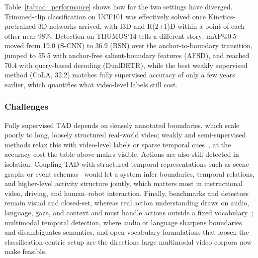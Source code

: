 Table~\ref{tab:ad_performance} shows how far the two settings have diverged. Trimmed-clip classification on UCF101 was effectively solved once Kinetics-pretrained 3D networks arrived, with I3D and R(2+1)D within a point of each other near 98\%. Detection on THUMOS'14 tells a different story: mAP@0.5 moved from 19.0 (S-CNN) to 36.9 (BSN) over the anchor-to-boundary transition, jumped to 55.5 with anchor-free salient-boundary features (AFSD), and reached 70.4 with query-based decoding (DualDETR), while the best weakly supervised method (CoLA, 32.2) matches fully supervised accuracy of only a few years earlier, which quantifies what video-level labels still cost.


\subsubsection{Challenges}
Fully supervised TAD depends on densely annotated boundaries, which scale poorly to long, loosely structured real-world video; weakly and semi-supervised methods relax this with video-level labels or sparse temporal cues~\cite{zhao2025pose,ghoddoosian2023weakly}, at the accuracy cost the table above makes visible.
Actions are also still detected in isolation. Coupling TAD with structured temporal representations such as scene graphs or event schemas~\cite{wu2025universal,lu2025benchmarking} would let a system infer boundaries, temporal relations, and higher-level activity structure jointly, which matters most in instructional video, driving, and human--robot interaction.
Finally, benchmarks and detectors remain visual and closed-set, whereas real action understanding draws on audio, language, gaze, and context and must handle actions outside a fixed vocabulary~\cite{zhou2024learning,bao2025exploiting,liu2026synergistic}; multimodal temporal detection, where audio or language sharpens boundaries and disambiguates semantics, and open-vocabulary formulations that loosen the classification-centric setup are the directions large multimodal video corpora now make feasible.
